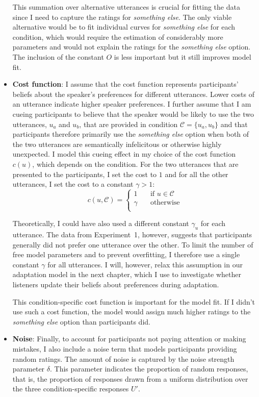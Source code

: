 \begin{itemize}
This summation over alternative utterances is crucial for fitting the data since I need to
capture the ratings for \textit{something else}. The only viable alternative would be
to fit individual curves for \textit{something else} for each condition, which would require
the estimation of considerably more parameters and would not explain the ratings for the
\textit{something else} option. The inclusion of the constant $O$ is less important but it
still improves model fit.


\item \textbf{Cost function}: I assume that the cost function represents participants' beliefs about the speaker's 
preferences for different utterances. Lower costs of an utterance indicate higher speaker preferences. I further 
assume that I am cueing participants to believe that the speaker would be likely to use the two utterances, $u_a$ 
and $u_b$, that are provided in condition $\mathscr{C}=\{u_a, u_b\}$ and that participants therefore primarily use the 
\textit{something else} option when both of the two utterances are semantically infelicitous or otherwise highly unexpected. 
I model this cueing effect in my choice of the cost function $c(u)$, which depends on the condition. For the two utterances 
that are presented to the participants, I set the cost to $1$ and for all the other utterances, I set the cost to a constant $\gamma > 1$:
$$
c(u, \mathscr{C}) = 
     \begin{cases}
       1 &\quad\text{if } u  \in \mathscr{C}\\
       \gamma &\quad\text{otherwise} \\
     \end{cases}
$$

Theoretically, I could have also used a different constant $\gamma_u$ for each utterance. The data from
Experiment~1, however, suggests that participants generally did not prefer one utterance over 
the other. To limit the number of free model parameters and to prevent overfitting, I therefore use a single
constant $\gamma$ for all utterances. I will, however, relax this assumption in our adaptation model in the next chapter, which
I use to investigate whether listeners update their beliefs about preferences during adaptation.

This condition-specific cost function is important for the model fit. If I didn't use such a cost function, 
the model would assign much higher ratings to the \textit{something else} option than participants did.

\item \textbf{Noise}: Finally, to account for participants not paying attention or making mistakes, 
I also include a noise term that models participants providing random ratings.
The amount of noise is captured by the noise strength parameter $\delta$. This parameter
indicates the proportion of random responses, that is, the proportion of responses drawn from a uniform distribution
over the three condition-specific responses $U'$. 


\end{itemize}
